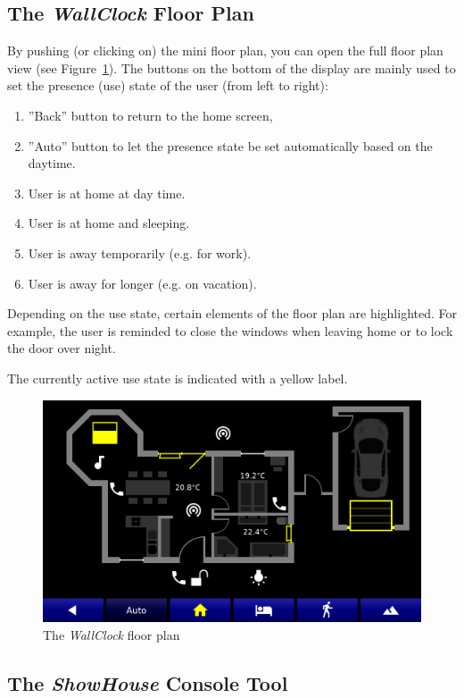 \documentclass[12pt,english,parskip=half,headheight=19pt]{scrreprt}
\begin{document}
\subsection{The \textit{WallClock} Floor Plan}
\label{sec:tutorial-firststeps-floorplan}

By pushing (or clicking on) the mini floor plan, you can open the full floor plan view (see Figure~\ref{fig:tutorial-floorplan}). The buttons on the bottom of the display are mainly used to set the presence (use) state of the user (from left to right):

\begin{enumerate}
  \item ''Back'' button to return to the home screen,
  \item ''Auto'' button to let the presence state be set automatically based on the daytime.
  \item User is at home at day time.
  \item User is at home and sleeping.
  \item User is away temporarily (e.g. for work).
  \item User is away for longer (e.g. on vacation).
\end{enumerate}

Depending on the use state, certain elements of the floor plan are highlighted. For example, the user is reminded to close the windows when leaving home or to lock the door over night.

The currently active use state is indicated with a yellow label.

\begin{figure}[ht]
  \centering
  \includegraphics[width=0.7\linewidth]{figs/wallclock-floorplan-3.png}
  \caption[l]{The \textit{WallClock} floor plan}
  \label{fig:tutorial-floorplan}
\end{figure}



\subsection{The \textit{ShowHouse} Console Tool}
\label{sec:tutorial-firststeps-showhouse}
\end{document}
